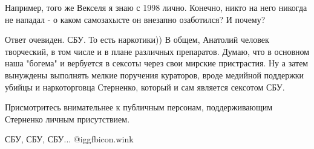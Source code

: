 \begin{itemize}
Например, того же Векселя я знаю с 1998 лично. Конечно, никто на него никогда
не нападал - о каком самозахысте он внезапно озаботился? И почему?

Ответ очевиден. СБУ. То есть наркотики)) В общем, Анатолий человек творческий,
в том числе и в плане различных препаратов. Думаю, что в основном наша "богема"
и вербуется в сексоты через свои мирские пристрастия. Ну а затем вынуждены
выполнять мелкие поручения кураторов, вроде медийной поддержки убийцы и
наркоторговца Стерненко, который и сам является сексотом СБУ.

Присмотритесь внимательнее к публичным персонам, поддерживающим Стерненко личным присутствием.

СБУ, СБУ, СБУ...  @igg{fbicon.wink} 

\end{itemize} %
